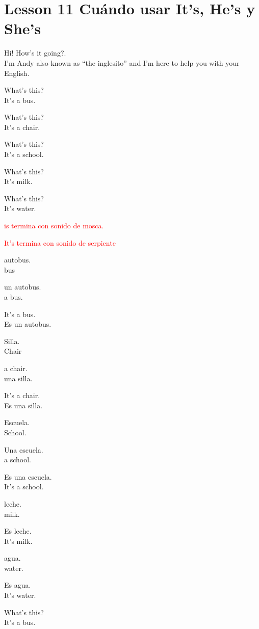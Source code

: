 \section{Lesson 11 Cuándo usar It's, He's y She's}

Hi! How's it going?.\\

I'm Andy also known as ``the inglesito'' and I'm here to help you with your
English.

What's this?\\
It's a bus.

What's this?\\
It's a chair.

What's this?\\
It's a school.

What's this?\\
It's milk.

What's this?\\
It's water.

\textcolor{red}{is termina con sonido de mosca.}

\textcolor{red}{It's termina con sonido de serpiente}

autobus.\\
bus

un autobus.\\
a bus.

It's a bus.\\
Es un autobus.

Silla.\\
Chair

a chair.\\
una silla.

It's a chair.\\
Es una silla.

Escuela.\\
School.

Una escuela.\\
a school.

Es una escuela.\\
It's a school.

leche.\\
milk.

Es leche.\\
It's milk.

agua.\\
water.

Es agua.\\
It's water.

What's this?\\
It's a bus.

